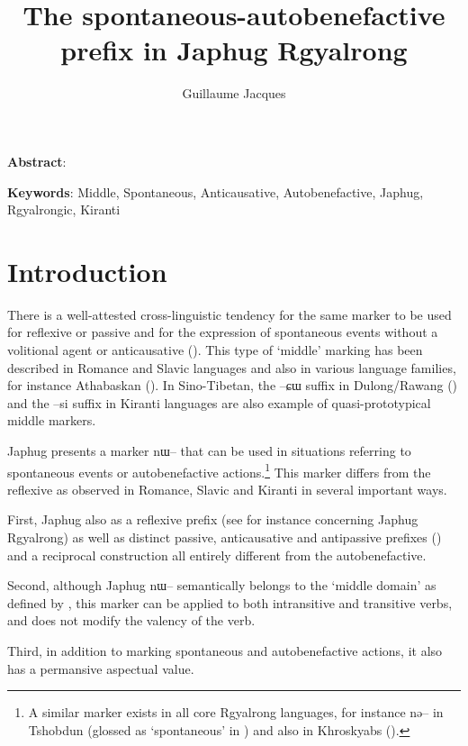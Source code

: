 \documentclass[oldfontcommands,oneside,a4paper,11pt]{article}
\newcommand{\ipa}[1]{{\phon \mbox{#1}}} %
\begin{document}
 
 \title{ The spontaneous-autobenefactive prefix in Japhug Rgyalrong
} 
\author{Guillaume Jacques}
\maketitle
\linenumbers
\sloppy

\textbf{Abstract}:

\textbf{Keywords}: Middle, Spontaneous, Anticausative, Autobenefactive, Japhug, Rgyalrongic, Kiranti


\section{Introduction}
There is a well-attested cross-linguistic tendency for the same marker to be used for reflexive or passive and for the expression of spontaneous events without a volitional agent or anticausative (\citealt[142-144]{kemmer93middle}). This type of `middle' marking has been described in Romance and Slavic languages and also in various language families, for instance Athabaskan (\citealt{thompson96middle}). In Sino-Tibetan, the \ipa{--ɕɯ} suffix in Dulong/Rawang (\citealt{lapolla05reflexive}) and the \ipa{--si} suffix in Kiranti languages are also example of quasi-prototypical middle markers.

Japhug presents a marker \ipa{nɯ--} that can be used in situations referring to  spontaneous events or autobenefactive actions.\footnote{A similar marker exists in all core Rgyalrong languages, for instance \ipa{nə--} in Tshobdun (glossed as `spontaneous' in \citealt[634]{jackson14morpho}) and also in Khroskyabs (\citealt[157-160]{lai13affixale}).} This marker differs from the reflexive as observed in Romance, Slavic and Kiranti in several important ways.

First, Japhug also as a  reflexive prefix (see for instance \citealt{jacques10refl} concerning Japhug Rgyalrong) as well as distinct passive, anticausative and antipassive prefixes (\citealt{jacques12demotion}) and a reciprocal construction all entirely different from the autobenefactive.


Second, although Japhug  \ipa{nɯ--}  semantically belongs to the ‘middle domain’ as defined by \citet[15]{kemmer93middle}, this marker can be applied to both intransitive and transitive verbs,  and does not modify the valency of the verb.
 
 Third, in addition to marking spontaneous and autobenefactive actions, it also has a permansive aspectual value.
 
\end{document}
